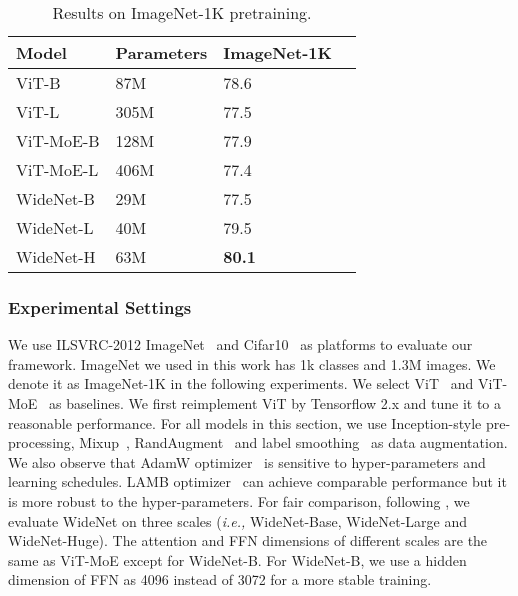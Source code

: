 \documentclass[letterpaper]{article} \usepackage{aaai22}  \usepackage{times}  \usepackage{helvet}  \usepackage{courier}  \usepackage[hyphens]{url}  \usepackage{graphicx} \urlstyle{rm} \def\UrlFont{\rm}  \usepackage{natbib}  \usepackage{caption} \DeclareCaptionStyle{ruled}{labelfont=normalfont,labelsep=colon,strut=off} \frenchspacing  \setlength{\pdfpagewidth}{8.5in}  \setlength{\pdfpageheight}{11in}  \usepackage{algorithm}
\newcommand{\ie}{\emph{i.e.,}\xspace}
\begin{document}
\begin{table}[t]
\centering
\caption{Results on ImageNet-1K pretraining.}
\label{tbl-main-pretraining-ImageNet}
\begin{tabular}{l|l l l}
\toprule
Model     & Parameters & ImageNet-1K  \\ \midrule
ViT-B               & 87M       & 78.6        \\
ViT-L              & 305M         & 77.5   \\ \midrule
ViT-MoE-B           & 128M          & 77.9   \\
ViT-MoE-L           & 406M        & 77.4   \\ \midrule
WideNet-B         & 29M        & 77.5       \\
WideNet-L          & 40M     & 79.5       \\
WideNet-H          & 63M      & \textbf{80.1}      \\
\bottomrule
\end{tabular}
\end{table}







\subsubsection{Experimental Settings}
\label{sec:cv-settings}


We use ILSVRC-2012 ImageNet~\citep{deng2009imagenet} and Cifar10~\citep{krizhevsky2009learning} as platforms to evaluate our framework. ImageNet we used in this work has 1k classes and 1.3M images. We denote it as ImageNet-1K in the following experiments. We select ViT~\citep{dosovitskiy2020image} and ViT-MoE~\citep{riquelme2021scaling} as baselines. We first reimplement ViT by Tensorflow 2.x and tune it to a reasonable performance. For all models in this section, we use Inception-style pre-processing, Mixup~\citep{zhang2017mixup}, RandAugment~\citep{cubuk2020randaugment} and label smoothing~\citep{szegedy2016rethinking,yuan2020revisiting} as data augmentation. We also observe that AdamW optimizer~\citep{loshchilov2017decoupled} is sensitive to hyper-parameters and learning schedules. LAMB optimizer~\citep{you2019large} can achieve comparable performance but it is more robust to the hyper-parameters. For fair comparison, following \citet{zhai2021scaling}, we evaluate WideNet on three scales (\ie WideNet-Base, WideNet-Large and WideNet-Huge). The attention and FFN dimensions of different scales are the same as ViT-MoE except for WideNet-B. For WideNet-B, we use a hidden dimension of FFN as 4096 instead of 3072 for a more stable training.
\end{document}
